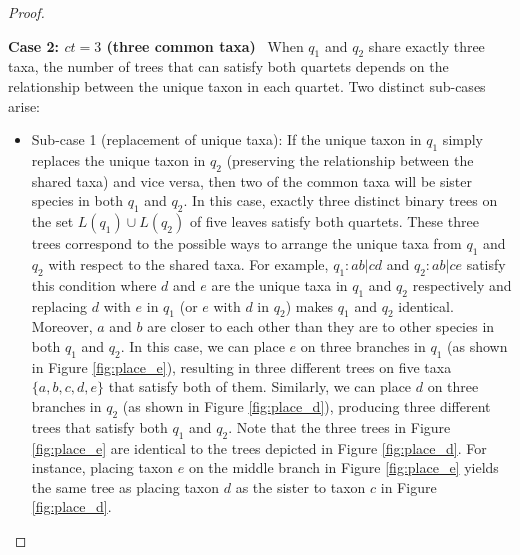\documentclass[10pt,a4paper]{article}
\newcommand{\add}[1]{{\color{blue} #1}}
\newcommand{\addb}[1]{{\color{red} #1}}
\begin{document}
\begin{proof}
\begin{itemize}
\begin{itemize}
\begin{itemize}
\end{itemize}
\end{itemize}




\textbf{Case 2: $ct = 3$ (three common taxa)} \ When $q_1$ and $q_2$ share exactly three taxa, the number of trees that can satisfy both quartets depends on the relationship between the unique taxon in each quartet. Two distinct sub-cases arise:

\begin{itemize} \item Sub-case 1 (replacement of unique taxa): If the unique taxon in $q_1$ simply replaces the unique taxon in $q_2$ (preserving the relationship between the shared taxa) and vice versa, then two of the common taxa will be sister species in both $q_1$ and $q_2$. In this case, exactly three distinct binary trees on the set $L(q_1)\cup L(q_2)$ of five leaves satisfy both quartets. These three trees correspond to the possible ways to arrange the unique taxa from $q_1$ and $q_2$ with respect to the shared taxa. For example, $q_1: ab|cd$ and $q_2: ab|ce$ satisfy this condition where $d$ and $e$ are the unique taxa in $q_1$ and $q_2$ respectively and replacing $d$ with $e$ in $q_1$ (or $e$ with $d$ in $q_2$) makes $q_1$ and $q_2$ identical. Moreover, $a$ and $b$ are closer to each other than they are to other species in both $q_1$ and $q_2$. In this case, we can place $e$ on three branches in $q_1$ (as shown in Figure \ref{fig:place_e}), resulting in three different trees on five taxa $\{a,b,c,d,e\}$ that satisfy both of them. Similarly, we can place $d$ on three branches in $q_2$ (as shown in Figure \ref{fig:place_d}), producing three different trees that satisfy both $q_1$ and $q_2$. Note that the three trees in Figure \ref{fig:place_e} are identical to the trees depicted in Figure \ref{fig:place_d}. For instance, placing taxon $e$ on the middle branch in Figure \ref{fig:place_e} yields the same tree as placing taxon $d$ as the sister to taxon $c$ in Figure \ref{fig:place_d}.


\end{itemize}
\end{itemize}
\end{proof}
\end{document}
